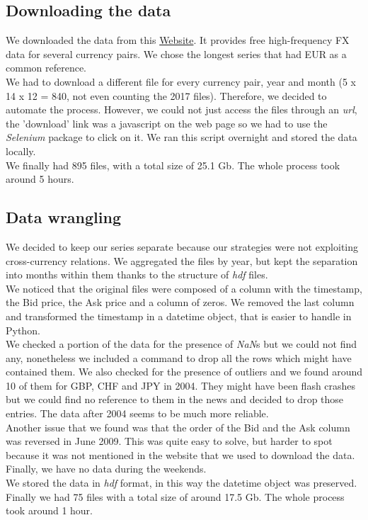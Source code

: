 \documentclass[a4paper]{article}
\begin{document}
\subsection{Downloading the data} 

We downloaded the data from this \href{http://www.histdata.com/download-free-forex-historical-data/?/ascii/tick-data-quotes}{Website}. It provides free high-frequency FX data for several currency pairs. We chose the longest series that had EUR as a common reference.\\
We had to download a different file for every currency pair, year and month (5 x 14 x 12 = 840, not even counting the 2017 files). Therefore, we decided to automate the process. However, we could not just access the files through an \emph{url}, the 'download' link was a javascript on the web page so we had to use the \emph{Selenium} package to click on it. We ran this script overnight and stored the data locally. \\
We finally had 895 files, with a total size of 25.1 Gb. The whole process took around 5 hours.

\subsection{Data wrangling} 

We decided to keep our series separate because our strategies were not exploiting cross-currency relations. We aggregated the files by year, but kept the separation into months within them thanks to the structure of \emph{hdf} files.\\
We noticed that the original files were composed of a column with the timestamp, the Bid price, the Ask price and a column of zeros. We removed the last column and transformed the timestamp in a datetime object, that is easier to handle in Python.\\
We checked a portion of the data for the presence of \emph{NaN}s but we could not find any, nonetheless we included a command to drop all the rows which might have contained them. We also checked for the presence of outliers and we found around 10 of them for GBP, CHF and JPY in 2004. They might have been flash crashes but we could find no reference to them in the news and decided to drop those entries. The data after 2004 seems to be much more reliable.\\
Another issue that we found was that the order of the Bid and the Ask column was reversed in June 2009. This was quite easy to solve, but harder to spot because it was not mentioned in the website that we used to download the data.\\
Finally, we have no data during the weekends.\\
We stored the data in \emph{hdf} format, in this way the datetime object was preserved. Finally we had 75 files with a total size of around 17.5 Gb. The whole process took around 1 hour.
\end{document}
